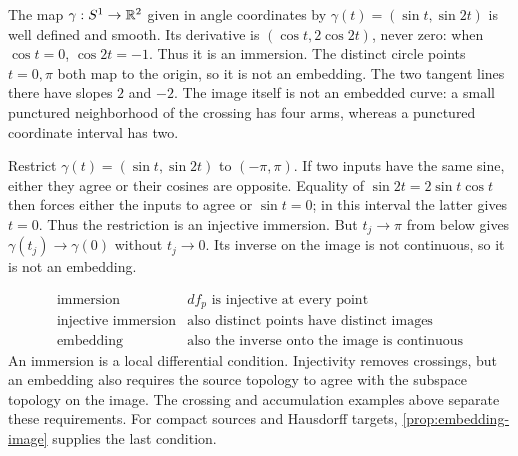 \begin{example}\label{ex:immersed-crossing}
The map $\gamma:S^1\to\mathbb{R}^2$ given in angle coordinates by
$\gamma(t)=(\sin t,\sin2t)$ is well defined and smooth.
Its derivative is $(\cos t,2\cos2t)$, never zero: when $\cos t=0$,
$\cos2t=-1$. Thus it is an immersion. The distinct circle points
$t=0,\pi$ both map to the origin, so it is not an embedding.
The two tangent lines there have slopes $2$ and $-2$. The image itself
is not an embedded curve: a small punctured neighborhood of the crossing
has four arms, whereas a punctured coordinate interval has two.
\end{example}
\begin{example}
Restrict $\gamma(t)=(\sin t,\sin2t)$ to $(-\pi,\pi)$.
If two inputs have the same sine, either they agree or their cosines are
opposite. Equality of $\sin2t=2\sin t\cos t$ then forces either the
inputs to agree or $\sin t=0$; in this interval the latter gives $t=0$.
Thus the restriction is an injective immersion. But $t_j\to\pi$ from
below gives $\gamma(t_j)\to\gamma(0)$ without $t_j\to0$. Its inverse
on the image is not continuous, so it is not an embedding.
\end{example}

\begin{remark}
\[
\begin{array}{c|l}
\text{immersion}&df_p\text{ is injective at every point}\\
\text{injective immersion}&\text{also distinct points have distinct images}\\
\text{embedding}&\text{also the inverse onto the image is continuous}
\end{array}
\]
An immersion is a local differential condition. Injectivity removes
crossings, but an embedding also requires the source topology to agree
with the subspace topology on the image. The crossing and accumulation
examples above separate these requirements. For compact sources and
Hausdorff targets, \cref{prop:embedding-image} supplies the last condition.
\end{remark}

